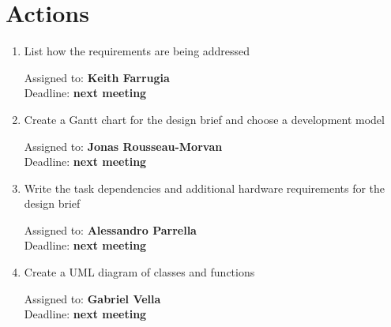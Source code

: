 \documentclass{cce2014-meetings}
\begin{document}
\section*{Actions}

\begin{enumerate}

      \item List how the requirements are being addressed
            \begin{flushright}
                  Assigned to: \textbf{Keith Farrugia} \\
                  Deadline: \textbf{next meeting}
            \end{flushright}

      \item Create a Gantt chart for the design brief and choose a development model
            \begin{flushright}
                  Assigned to: \textbf{Jonas Rousseau-Morvan} \\
                  Deadline: \textbf{next meeting}
            \end{flushright}

      \item Write the task dependencies and additional hardware requirements for the design brief
            \begin{flushright}
                  Assigned to: \textbf{Alessandro Parrella} \\
                  Deadline: \textbf{next meeting}
            \end{flushright}

      \item Create a UML diagram of classes and functions
            \begin{flushright}
                  Assigned to: \textbf{Gabriel Vella} \\
                  Deadline: \textbf{next meeting}
            \end{flushright}


\end{enumerate}
\end{document}
